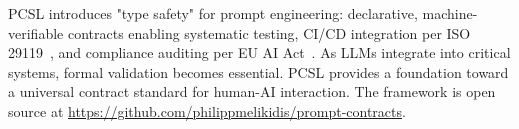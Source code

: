 \documentclass[sigconf]{acmart}
\begin{document}
PCSL introduces "type safety" for prompt engineering: declarative, machine-verifiable contracts enabling systematic testing, CI/CD integration per ISO 29119~\cite{iso29119}, and compliance auditing per EU AI Act~\cite{euaiact2024}. As LLMs integrate into critical systems, formal validation becomes essential. PCSL provides a foundation toward a universal contract standard for human-AI interaction. The framework is open source at \url{https://github.com/philippmelikidis/prompt-contracts}.



\end{document}
